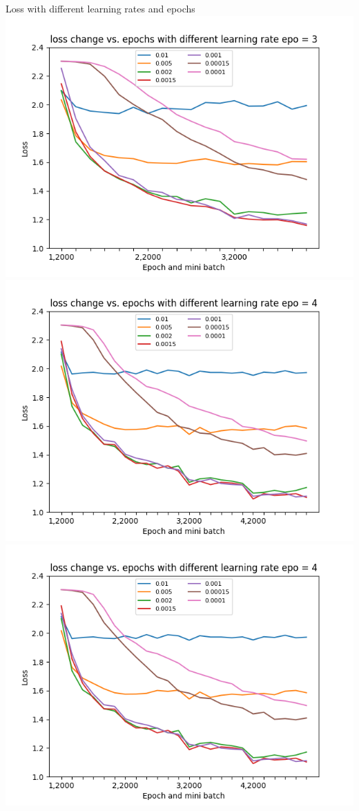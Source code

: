 \begin{frame}{Loss with different learning rates and epochs}
    \includegraphics[scale=.3]{images/loss change vs. epochs with different learning rate epo = 3.png}
    \includegraphics[scale=.3]{images/loss change vs. epochs with different learning rate epo = 4.png}
    \includegraphics[scale=.3]{images/loss change vs. epochs with different learning rate epo = 4.png}
\end{frame}

